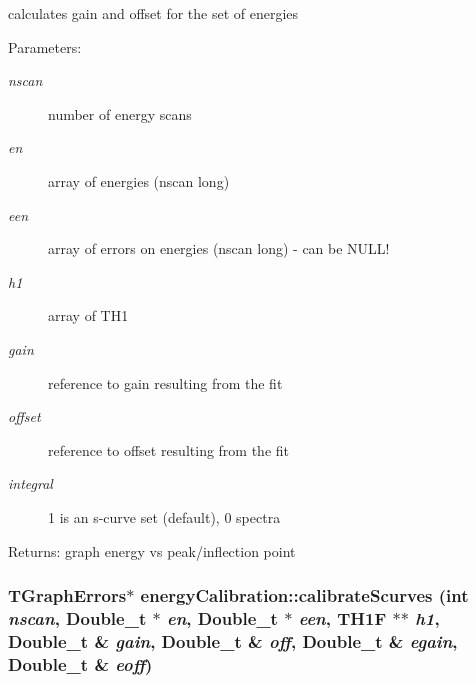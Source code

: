 calculates gain and offset for the set of energies \begin{Desc}
\item[Parameters:]
\begin{description}
\item[{\em nscan}]number of energy scans \item[{\em en}]array of energies (nscan long) \item[{\em een}]array of errors on energies (nscan long) - can be NULL! \item[{\em h1}]array of TH1 \item[{\em gain}]reference to gain resulting from the fit \item[{\em offset}]reference to offset resulting from the fit \item[{\em integral}]1 is an s-curve set (default), 0 spectra \end{description}
\end{Desc}
\begin{Desc}
\item[Returns:]graph energy vs peak/inflection point \end{Desc}
\subsubsection{\setlength{\rightskip}{0pt plus 5cm}TGraph\-Errors$\ast$ energy\-Calibration::calibrate\-Scurves (int {\em nscan}, Double\_\-t $\ast$ {\em en}, Double\_\-t $\ast$ {\em een}, TH1F $\ast$$\ast$ {\em h1}, Double\_\-t \& {\em gain}, Double\_\-t \& {\em off}, Double\_\-t \& {\em egain}, Double\_\-t \& {\em eoff})\hspace{0.3cm}{\tt  [inline]}}\label{classenergyCalibration_6f5ee6771522a31e4fe1eca143e2aa9b}


